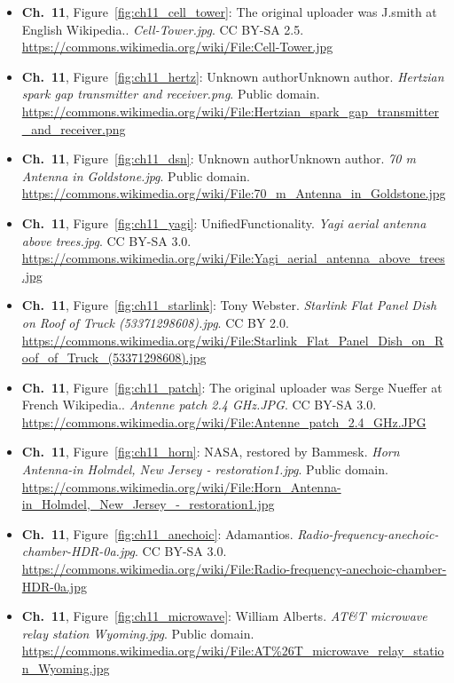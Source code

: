 \begin{small}
\begin{itemize}[leftmargin=0pt,itemsep=2pt,label={}]
\item \textbf{Ch.~11}, Figure~\ref{fig:ch11_cell_tower}: The original uploader was J.smith at English Wikipedia.. \emph{Cell-\allowbreak{}Tower.\allowbreak{}jpg}. CC BY-SA 2.5. \url{https://commons.wikimedia.org/wiki/File:Cell-Tower.jpg}
\item \textbf{Ch.~11}, Figure~\ref{fig:ch11_hertz}: Unknown authorUnknown author. \emph{Hertzian spark gap transmitter and receiver.\allowbreak{}png}. Public domain. \url{https://commons.wikimedia.org/wiki/File:Hertzian_spark_gap_transmitter_and_receiver.png}
\item \textbf{Ch.~11}, Figure~\ref{fig:ch11_dsn}: Unknown authorUnknown author. \emph{70 m Antenna in Goldstone.\allowbreak{}jpg}. Public domain. \url{https://commons.wikimedia.org/wiki/File:70_m_Antenna_in_Goldstone.jpg}
\item \textbf{Ch.~11}, Figure~\ref{fig:ch11_yagi}: UnifiedFunctionality. \emph{Yagi aerial antenna above trees.\allowbreak{}jpg}. CC BY-SA 3.0. \url{https://commons.wikimedia.org/wiki/File:Yagi_aerial_antenna_above_trees.jpg}
\item \textbf{Ch.~11}, Figure~\ref{fig:ch11_starlink}: Tony Webster. \emph{Starlink Flat Panel Dish on Roof of Truck (53371298608).\allowbreak{}jpg}. CC BY 2.0. \url{https://commons.wikimedia.org/wiki/File:Starlink_Flat_Panel_Dish_on_Roof_of_Truck_(53371298608).jpg}
\item \textbf{Ch.~11}, Figure~\ref{fig:ch11_patch}: The original uploader was Serge Nueffer at French Wikipedia.. \emph{Antenne patch 2.\allowbreak{}4 GHz.\allowbreak{}JPG}. CC BY-SA 3.0. \url{https://commons.wikimedia.org/wiki/File:Antenne_patch_2.4_GHz.JPG}
\item \textbf{Ch.~11}, Figure~\ref{fig:ch11_horn}: NASA, restored by Bammesk. \emph{Horn Antenna-\allowbreak{}in Holmdel, New Jersey -\allowbreak{} restoration1.\allowbreak{}jpg}. Public domain. \url{https://commons.wikimedia.org/wiki/File:Horn_Antenna-in_Holmdel,_New_Jersey_-_restoration1.jpg}
\item \textbf{Ch.~11}, Figure~\ref{fig:ch11_anechoic}: Adamantios. \emph{Radio-\allowbreak{}frequency-\allowbreak{}anechoic-\allowbreak{}chamber-\allowbreak{}HDR-\allowbreak{}0a.\allowbreak{}jpg}. CC BY-SA 3.0. \url{https://commons.wikimedia.org/wiki/File:Radio-frequency-anechoic-chamber-HDR-0a.jpg}
\item \textbf{Ch.~11}, Figure~\ref{fig:ch11_microwave}: William Alberts. \emph{AT\&T microwave relay station Wyoming.\allowbreak{}jpg}. Public domain. \url{https://commons.wikimedia.org/wiki/File:AT%26T_microwave_relay_station_Wyoming.jpg}

\end{itemize}
\end{small}
